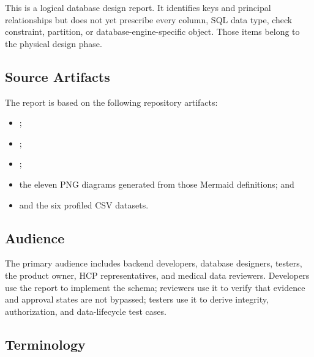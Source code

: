 This is a logical database design report. It identifies keys and principal relationships but does not yet prescribe every column, SQL data type, check constraint, partition, or database-engine-specific object. Those items belong to the physical design phase.

\subsection{Source Artifacts}

The report is based on the following repository artifacts:
\begin{itemize}
  \item {};
  \item {};
  \item {};
  \item the eleven PNG diagrams generated from those Mermaid definitions; and
  \item {} and the six profiled CSV datasets.
\end{itemize}

\subsection{Audience}

The primary audience includes backend developers, database designers, testers, the product owner, HCP representatives, and medical data reviewers. Developers use the report to implement the schema; reviewers use it to verify that evidence and approval states are not bypassed; testers use it to derive integrity, authorization, and data-lifecycle test cases.

\subsection{Terminology}

